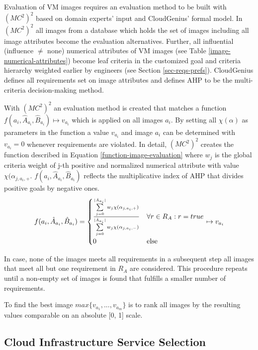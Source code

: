 \documentclass[10pt]{article}
\begin{document}
Evaluation of VM images requires an evaluation method to be built with $(MC^2)^2$ based on domain experts' input and CloudGenius' formal model. 
In $(MC^2)^2$ all images from a database which holds the set of images including all image attributes become the evaluation alternatives.
Further, all influential (influence $\neq$ none) numerical attributes of VM images (see Table \ref{image-numerical-attributes}) become leaf criteria in the customized goal and criteria hierarchy weighted earlier by engineers (see Section \ref{sec-reqs-prefs}).
CloudGenius defines all requirements set on image attributes and defines AHP to be the multi-criteria decision-making method.

With $(MC^2)^2$ an evaluation method is created that matches a function $f(a_i, \hat{A}_{a_i}, \hat{B}_{a_i})\mapsto{}v_{a_i}$ which is applied on all images $a_i$. By setting all $\chi(\alpha)$ as parameters in the function a value $v_{a_i}$ and image $a_i$ can be determined with $v_{a_i} = 0$ whenever requirements are violated. In detail, $(MC^2)^2$ creates the function described in Equation \ref{function-image-evaluation} where $w_j$ is the global criteria weight of j-th positive and normalized numerical attribute with value $\chi(\alpha_{j,a_i,+}$. $f(a_i, \hat{A}_{a_i}, \hat{B}_{a_i})$ reflects the multiplicative index of AHP that divides positive goals by negative ones.
\begin{equation}\label{function-image-evaluation}
f(a_i, \hat{A}_{a_i}, \hat{B}_{a_i}) = 
\begin{cases}
\sum\limits_{j=0}^{|\hat{A}_{a_i}|} w_j\chi(\alpha_{j,a_i,+})\over{\sum\limits_{j=0}^{|\hat{A}_{a_i}|} w_j\chi(\alpha_{j,a_i,-})} & \forall r \in R_A: r=true\\
0 & \text{else}
\end{cases}
\mapsto{} v_{a_i}
\end{equation}

In case, none of the images meets all requirements in a subsequent step all images that meet all but one requirement in $R_A$ are considered. This procedure repeats until a non-empty set of images is found that fulfills a smaller number of requirements.

To find the best image $max \{v_{a_1},...,v_{a_m}\}$ is to rank all images by the resulting values comparable on an absolute [0, 1] scale.


\subsection{Cloud Infrastructure Service Selection}
\end{document}
